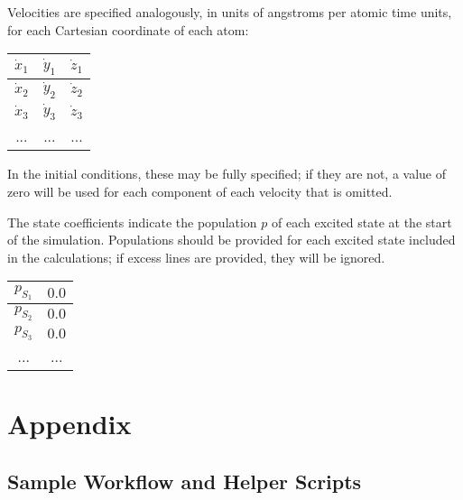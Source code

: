 \documentclass[12pt,letter,footinclude=true,headinclude=true,hyphens]{book} %
\begin{document}
    Velocities are specified analogously, in units of angstroms per atomic time units, for each Cartesian coordinate of each atom:
    
    \begin{center}
    \begin{tabular}{ | c | c | c | } \hline
    $\dot{x}_1$ & $\dot{y}_1$ & $\dot{z}_1$ \\ \hline
    $\dot{x}_2$ & $\dot{y}_2$ & $\dot{z}_2$ \\ \hline
    $\dot{x}_3$ & $\dot{y}_3$ & $\dot{z}_3$ \\ \hline
    ... & ... & ... \\ \hline
    \end{tabular}
    \end{center}
    
    In the initial conditions, these may be fully specified; if they are not, a value of zero will be used for each component of each velocity that is omitted.
    
    The state coefficients indicate the population $p$ of each excited state at the start of the simulation. Populations should be provided for each excited state included in the calculations; if excess lines are provided, they will be ignored.
    
    \begin{center}
    \begin{tabular}{ | c | c | } \hline
    $p_{S_1}$ & $0.0$ \\ \hline
    $p_{S_2}$ & $0.0$ \\ \hline
    $p_{S_3}$ & $0.0$ \\ \hline
    ... & ... \\ \hline
    \end{tabular}
    \end{center}
    
%	

    \appendix
    \cleardoublepage\part{Appendix}
    
    \chapter{Sample Workflow and Helper Scripts}
    
\end{document}
